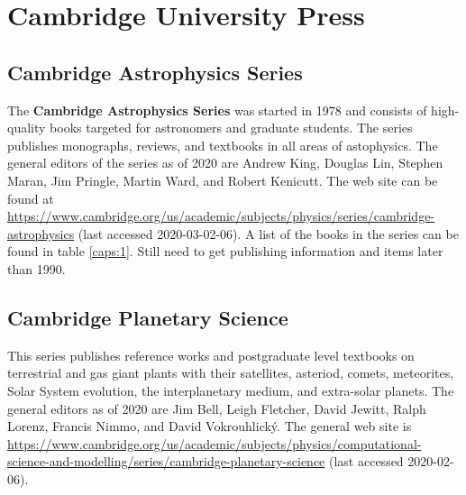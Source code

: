 \section{Cambridge University Press}

\subsection{Cambridge Astrophysics Series}

The {\bfseries Cambridge Astrophysics Series} was started in 1978 and
consists of high-quality books targeted for astronomers and graduate
students. The series publishes monographs, reviews, and textbooks in
all areas of astophysics. The general editors of the series as of 2020
are Andrew King, Douglas Lin, Stephen Maran, Jim Pringle, Martin Ward,
and Robert Kenicutt.  The web site can be found at
\url{https://www.cambridge.org/us/academic/subjects/physics/series/cambridge-astrophysics}
(last accessed 2020-03-02-06).  A list of the books in the series can
be found in table \ref{caps:1}.  Still need to get publishing
information and items later than 1990.

\subsection{Cambridge Planetary Science}

This series publishes reference works and postgraduate level textbooks
on terrestrial and gas giant plants with their satellites, asteriod,
comets, meteorites, Solar System evolution, the interplanetary medium,
and extra-solar planets.  The general editors as of 2020 are Jim Bell,
Leigh Fletcher, David Jewitt, Ralph Lorenz, Francis Nimmo, and David
Vokrouhlický.  The general web site is
\url{https://www.cambridge.org/us/academic/subjects/physics/computational-science-and-modelling/series/cambridge-planetary-science}
(last accessed 2020-02-06).
